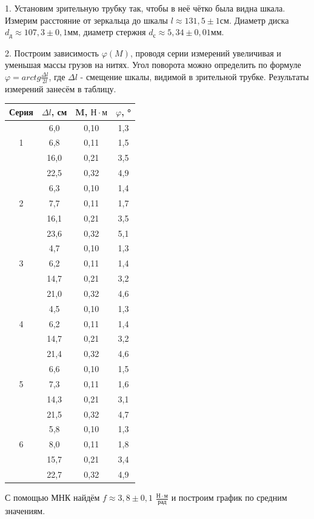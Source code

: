\documentclass[a4paper, 12pt]{article}
\begin{document}
				1. Установим зрительную трубку так, чтобы в неё чётко была видна шкала. Измерим расстояние от зеркальца до шкалы $l \approx 131,5 \pm 1 см$. Диаметр диска $d_д \approx 107,3 \pm 0,1 мм$, диаметр стержня $d_с \approx 5,34 \pm 0,01 мм $.
				
				2. Построим зависимость $\varphi(M)$, проводя серии измерений увеличивая и уменьшая массы грузов на нитях. Угол поворота можно определить по формуле $\varphi = arctg \frac{\Delta l}{2l}$, где $\Delta l$ - смещение шкалы, видимой в зрительной трубке. Результаты измерений занесём в таблицу.
				\begin{longtable}[H]{|c|c|c|c|}
					\hline
					Серия & $\Delta l$, см & M, $Н \cdot м$ & $\varphi$, ° \\
					\hline
					& 6,0 & 0,10 & 1,3 \\
					1 & 6,8 & 0,11 & 1,5 \\
					& 16,0 & 0,21 & 3,5 \\
					& 22,5 & 0,32 & 4,9 \\
					\hline
					& 6,3 & 0,10 & 1,4 \\
					2 & 7,7 & 0,11 & 1,7 \\
					& 16,1 & 0,21 & 3,5 \\
					& 23,6 & 0,32 & 5,1 \\
					\hline
					& 4,7 & 0,10 & 1,3 \\
					3 & 6,2 & 0,11 & 1,4 \\
					& 14,7 & 0,21 & 3,2 \\
					& 21,0 & 0,32 & 4,6 \\
					\hline
					& 4,5 & 0,10 & 1,3 \\
					4 & 6,2 & 0,11 & 1,4 \\
					& 14,7 & 0,21 & 3,2 \\
					& 21,4 & 0,32 & 4,6 \\
					\hline
					& 6,6 & 0,10 & 1,5 \\
					5 & 7,3 & 0,11 & 1,6 \\
					& 14,3 & 0,21 & 3,1 \\
					& 21,5 & 0,32 & 4,7 \\
					\hline
					& 5,8 & 0,10 & 1,3 \\
					6 & 8,0 & 0,11 & 1,8 \\
					& 15,7 & 0,21 & 3,4 \\
					& 22,7 & 0,32 & 4,9 \\
					\hline
				\end{longtable}
			С помощью МНК найдём $f \approx 3,8 \pm 0,1$ $\frac{Н \cdot м}{рад}$ и построим график по средним значениям.
\end{document}

